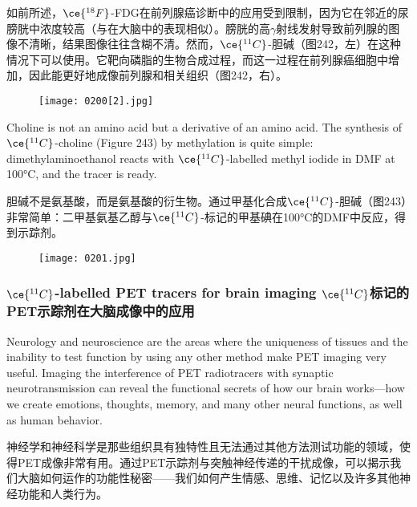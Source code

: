 \documentclass[dvipsnames, svgnames,a4paper,11pt]{article}
\begin{document}
如前所述，\(\ce{^{18}F}\)-FDG在前列腺癌诊断中的应用受到限制，因为它在邻近的尿膀胱中浓度较高（与在大脑中的表现相似）。膀胱的高$\gamma$射线发射导致前列腺的图像不清晰，结果图像往往含糊不清。然而，\(\ce{^{11}C}\)-胆碱（图242，左）在这种情况下可以使用。它靶向磷脂的生物合成过程，而这一过程在前列腺癌细胞中增加，因此能更好地成像前列腺和相关组织（图242，右）。

\begin{figure}[h]
	\centering
    \texttt{[image: 0200[2].jpg]}  
     \label{fig242}
\end{figure}


Choline is not an amino acid but a derivative of an amino acid. The synthesis of \(\ce{^{11}C}\)-choline (Figure 243) by methylation is quite simple: dimethylaminoethanol reacts with \(\ce{^{11}C}\)-labelled methyl iodide in DMF at 100°C, and the tracer is ready.

胆碱不是氨基酸，而是氨基酸的衍生物。通过甲基化合成\(\ce{^{11}C}\)-胆碱（图243）非常简单：二甲基氨基乙醇与\(\ce{^{11}C}\)-标记的甲基碘在100°C的DMF中反应，得到示踪剂。

\begin{figure}[h]
	\centering
    \texttt{[image: 0201.jpg]}  
     \label{fig243}
\end{figure}

\subsubsection{\(\ce{^{11}C}\)-labelled PET tracers for brain imaging \(\ce{^{11}C}\)标记的PET示踪剂在大脑成像中的应用}  

Neurology and neuroscience are the areas where the uniqueness of tissues and the inability to test function by using any other method make PET imaging very useful. Imaging the interference of PET radiotracers with synaptic neurotransmission can reveal the functional secrets of how our brain works—how we create emotions, thoughts, memory, and many other neural functions, as well as human behavior.  

神经学和神经科学是那些组织具有独特性且无法通过其他方法测试功能的领域，使得PET成像非常有用。通过PET示踪剂与突触神经传递的干扰成像，可以揭示我们大脑如何运作的功能性秘密——我们如何产生情感、思维、记忆以及许多其他神经功能和人类行为。  
\end{document}
